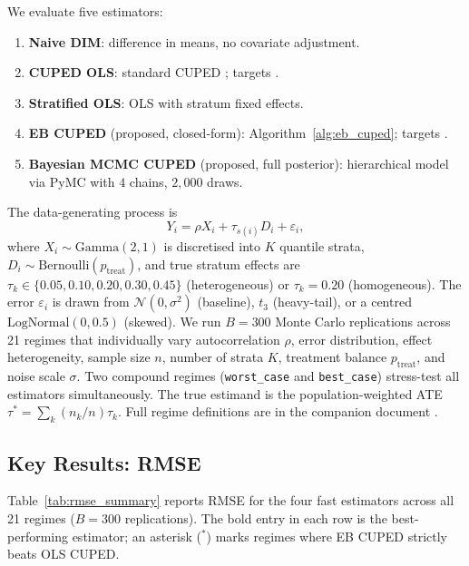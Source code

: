 \documentclass[12pt]{article}
\theoremstyle{plain}
\theoremstyle{definition}
\newcommand{\PATE}{\text{PATE}}
\newcommand{\VWATT}{\text{VWATT}}
\begin{document}
We evaluate five estimators:
\begin{enumerate}[label=\textbf{E\arabic*.}, nosep, leftmargin=2.5em]
  \item \textbf{Naive DIM}: difference in means, no covariate adjustment.
  \item \textbf{CUPED OLS}: standard CUPED \citep{deng2013improving};
        targets \VWATT.
  \item \textbf{Stratified OLS}: OLS with stratum fixed effects.
  \item \textbf{EB CUPED} (proposed, closed-form): Algorithm~\ref{alg:eb_cuped};
        targets \PATE.
  \item \textbf{Bayesian MCMC CUPED} (proposed, full posterior): hierarchical
        model via PyMC with $4$ chains, $2{,}000$ draws.
\end{enumerate}

The data-generating process is
\begin{equation}
  Y_i = \rho X_i + \tau_{s(i)} D_i + \varepsilon_i,
\end{equation}
where $X_i \sim \mathrm{Gamma}(2,1)$ is discretised into $K$ quantile strata,
$D_i \sim \mathrm{Bernoulli}(p_{\text{treat}})$, and true stratum effects are
$\tau_k \in \{0.05, 0.10, 0.20, 0.30, 0.45\}$ (heterogeneous) or
$\tau_k = 0.20$ (homogeneous).
The error $\varepsilon_i$ is drawn from $\mathcal{N}(0,\sigma^2)$ (baseline),
$t_3$ (heavy-tail), or a centred $\mathrm{LogNormal}(0,0.5)$ (skewed).
We run $B = 300$ Monte Carlo replications across 21 regimes that individually
vary autocorrelation $\rho$, error distribution, effect heterogeneity, sample
size $n$, number of strata $K$, treatment balance $p_{\text{treat}}$, and
noise scale $\sigma$.
Two compound regimes (\texttt{worst\_case} and \texttt{best\_case}) stress-test
all estimators simultaneously.
The true estimand is the population-weighted ATE
$\tau^* = \sum_k (n_k/n)\tau_k$.
Full regime definitions are in the companion document \citep{farahat2026sim}.

\subsection{Key Results: RMSE}

Table~\ref{tab:rmse_summary} reports RMSE for the four fast estimators across
all 21 regimes ($B = 300$ replications).
The bold entry in each row is the best-performing estimator; an asterisk
($^*$) marks regimes where EB CUPED strictly beats OLS CUPED.
\end{document}
